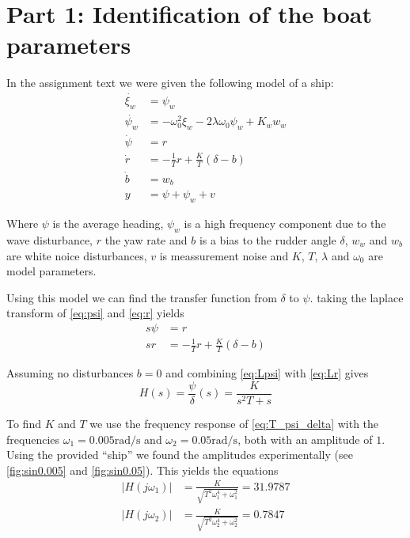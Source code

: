 \section{Part 1: Identification of the boat  parameters}

In the assignment text we were given the following model of a ship:
\begin{subequations}
	\label{eq:completeModel}
		\begin{align}
				\dot{\xi_w} &= \psi_w \label{eq:xi_w}\\
				\dot{\psi_w} &= -\omega_0^2\xi_w-2\lambda\omega_0\psi_w+K_ww_w \label{eq:psi_w}\\
				\dot{\psi} &= r \label{eq:psi} \\
				\dot{r} &= -\frac{1}{T}r+\frac{K}{T}(\delta-b) \label{eq:r} \\
				\dot{b} &= w_b \label{eq:b} \\
				y &= \psi + \psi_w + v \label{eq:y}
		\end{align}
\end{subequations}

Where $\psi$ is the average heading, $\psi_w$ is a high frequency component due to the wave disturbance, $r$ the yaw rate and $b$ is a bias to the rudder angle $\delta$, $w_w$ and $w_b$ are white noice disturbances, $v$ is meassurement noise and $K$, $T$, $\lambda$ and $\omega_0$ are model parameters.

Using this model we can find the transfer function from $\delta$ to $\psi$. taking the laplace transform of \cref{eq:psi} and \cref{eq:r} yields
\begin{subequations}
	\begin{align}
		s\psi &= r \label{eq:Lpsi}\\
		sr &= -\frac{1}{T}r + \frac{K}{T}(\delta-b) \label{eq:Lr}
	\end{align}
\end{subequations}

Assuming no disturbances $b = 0$ and combining \cref{eq:Lpsi} with \cref{eq:Lr} gives
\begin{equation}
	H(s) = \frac{\psi}{\delta}(s) = \frac{K}{s^2T+s} \label{eq:T_psi_delta}
\end{equation}

To find $K$ and $T$ we use the frequency response of \cref{eq:T_psi_delta} with the frequencies $\omega_1 = 0.005\si{\radian\per\second}$ and $\omega_2 = 0.05\si{\radian\per\second}$, both with an amplitude of $1$. Using the provided ``ship'' we found the amplitudes experimentally (see \cref{fig:sin0.005} and \cref{fig:sin0.05}). This yields the equations
\begin{subequations}
	\begin{align}
		|H(j\omega_1)| &= \frac{K}{\sqrt{T^2\omega_1^4 + \omega_1^2}} = 31.9787 \label{eq:omega_1}\\
		|H(j\omega_2)| &= \frac{K}{\sqrt{T^2\omega_2^4 + \omega_2^2}} = 0.7847 \label{eq:omega_2}
	\end{align}
\end{subequations}

